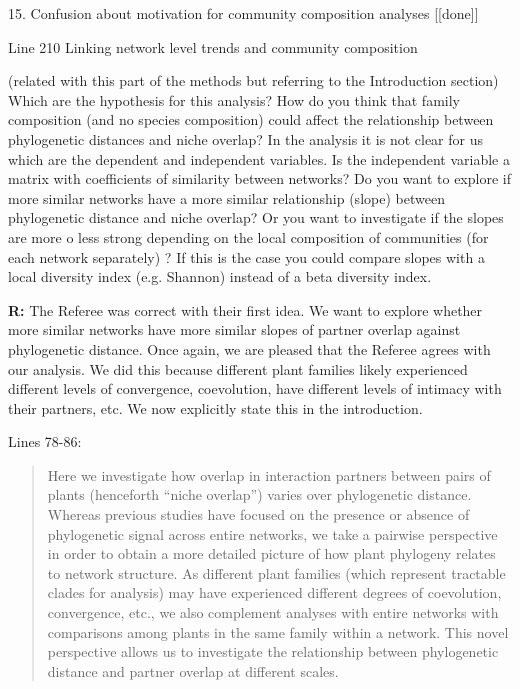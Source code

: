 \documentclass[12pt]{letter}
\newenvironment{refquote}{\bigskip \begin{it}}{\end{it}\smallskip}
\begin{document}
	15. Confusion about motivation for community composition analyses [[done]]

		\begin{refquote}
			Line 210 Linking network level trends and community composition

			(related with this part of the methods but referring to the Introduction section) Which are the hypothesis for this analysis? How do you think that family composition (and no species composition) could affect the relationship between phylogenetic  distances and niche overlap?
			In the analysis it is not clear for us which are the dependent and independent variables. Is the independent variable a matrix with coefficients of similarity between networks?  Do you want to explore if more similar networks have a more similar relationship (slope) between phylogenetic distance and niche overlap? Or you want to investigate if the slopes are more o less strong depending on the local composition of communities (for each network separately) ? If this is the case you could compare slopes with a local diversity index (e.g. Shannon) instead of a beta diversity index.
		\end{refquote}


		\textbf{R:} The Referee was correct with their first idea. We want to explore whether more similar networks have more similar slopes of partner overlap against phylogenetic distance. Once again, we are pleased that the Referee agrees with our analysis. We did this because different plant families likely experienced different levels of convergence, coevolution, have different levels of intimacy with their partners, etc. We now explicitly state this in the introduction.


		Lines 78-86:

		\begin{quotation}

			Here we investigate how overlap in interaction partners between 
			pairs of plants (henceforth ``niche overlap'') varies over 
			phylogenetic distance. 
			Whereas previous 
			studies have focused on the presence or absence of phylogenetic
			signal across entire networks, we take a pairwise perspective in
			order to obtain a more detailed picture of how plant phylogeny
			relates to network structure. As different plant families (which represent tractable clades for analysis) may have experienced different degrees of coevolution, convergence, etc., we also complement analyses with entire networks with comparisons among plants in the same family within a network. 
			This novel perspective allows us to investigate the relationship between phylogenetic distance and partner overlap at different scales. 

  		\end{quotation}
\end{document}
